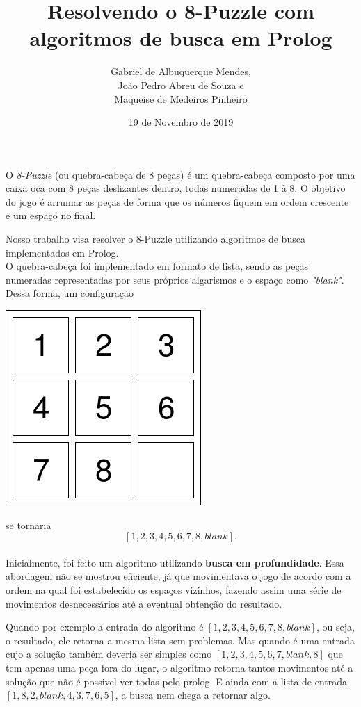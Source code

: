 \documentclass[12pt,a4paper]{article}
\author{Gabriel de Albuquerque Mendes,\\
 João Pedro Abreu de Souza e \\
 Maqueise de Medeiros Pinheiro}
\title{Resolvendo o 8-Puzzle com algoritmos de busca em Prolog}
\date{19 de Novembro de 2019}
\begin{document}
\maketitle
O \textit{8-Puzzle} (ou quebra-cabeça de 8 peças) é um quebra-cabeça composto por uma caixa oca com 8 peças deslizantes dentro, todas numeradas de 1 à 8. O objetivo do jogo é arrumar as peças de forma que os números fiquem em ordem crescente e um espaço no final.

Nosso trabalho visa resolver o 8-Puzzle utilizando algoritmos de busca implementados em Prolog.
\\

O quebra-cabeça foi implementado em formato de lista, sendo as peças numeradas representadas por seus próprios algarismos e o espaço como \textit{"blank"}. Dessa forma, um configuração
\begin{center}
\includegraphics[scale=0.5]{8puzzle.png} 
\end{center} 
se tornaria $$[1,2,3,4,5,6,7,8,blank].$$
\\

Inicialmente, foi feito um algoritmo utilizando \textbf{busca em profundidade}. Essa abordagem não se mostrou eficiente, já que movimentava o jogo de acordo com a ordem na qual foi estabelecido os espaços vizinhos, fazendo assim uma série de movimentos desnecessários até a eventual obtenção do resultado.

Quando por exemplo a entrada do algoritmo é $[1,2,3,4,5,6,7,8,blank]$, ou seja, o resultado, ele retorna a mesma lista sem problemas. Mas quando é uma entrada cujo a solução também deveria ser simples como $[1,2,3,4,5,6,7,blank,8]$ que tem apenas uma peça fora do lugar, o algoritmo retorna tantos movimentos até a solução que não é possivel ver todas pelo prolog. E ainda com a lista de entrada $[1,8,2,blank,4,3,7,6,5]$, a busca nem chega a retornar algo.
\\
\end{document}
